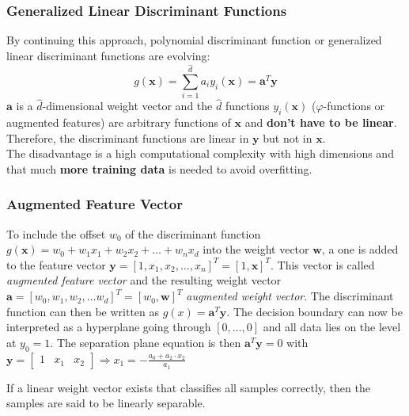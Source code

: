 \begin{multicols}{2}
   	   \subsubsection{Generalized Linear Discriminant Functions}
   	     By continuing this approach, polynomial discriminant function or generalized linear discriminant 
   	     functions are evolving: 
   	     $$g(\bm x) = \sum\limits_{i=1}^{\hat d} a_i y_i(\bm x) = \bm a^T \bm y$$
   	     $\bm a$ is a 
   	     $\hat d$-dimensional weight vector and the $\hat d$ functions $y_i(\bm x)$ ($\varphi$-functions 
   	     or augmented features) are arbitrary functions of $\bm x$ and \textbf{don't have to be linear}.
   	     Therefore, the discriminant functions are linear in $\bm y$ but not in $\bm x$.\\
   	     The disadvantage is a high computational complexity with high dimensions and that much 
   	     \textbf{more training data} is needed to avoid overfitting.
   	     
    \subsubsection{Augmented Feature Vector}
      To include the offset $w_0$ of the discriminant function $g(\bm x) = w_0 + w_1 x_1 + w_2 x_2 + \ldots + w_n x_d$ into the weight vector $\bm w$,
      a one is added to the feature vector  $\bm y = [1, x_1, x_2, \ldots, x_n]^T = [1, \bm x]^T$.
      This vector is called \emph{augmented feature vector} and the resulting weight vector $\bm a = [w_0, w_1, w_2, \ldots w_d]^T = [w_0, \bm w]^T$  \emph{augmented
      weight vector}.
      The discriminant function can then be written as $g(x) = \mathbf{a}^T \mathbf{y}$.
      The decision boundary can now be interpreted as a hyperplane going through $[0,\ldots,0]$ and 
      all data lies on the level at $y_0=1$.
      The separation plane equation is then $\mathbf{a}^T \mathbf{y} = 0$ with $\mathbf{y} = \begin{bmatrix}1 & x_1& x_2\end{bmatrix} \Rightarrow x_1=-\frac{a_0 + a_2\cdot x_2}{a_1}$
  \end{multicols}      


   

    If a linear weight vector exists that classifies all samples correctly, then the samples
    are said to be linearly separable.

